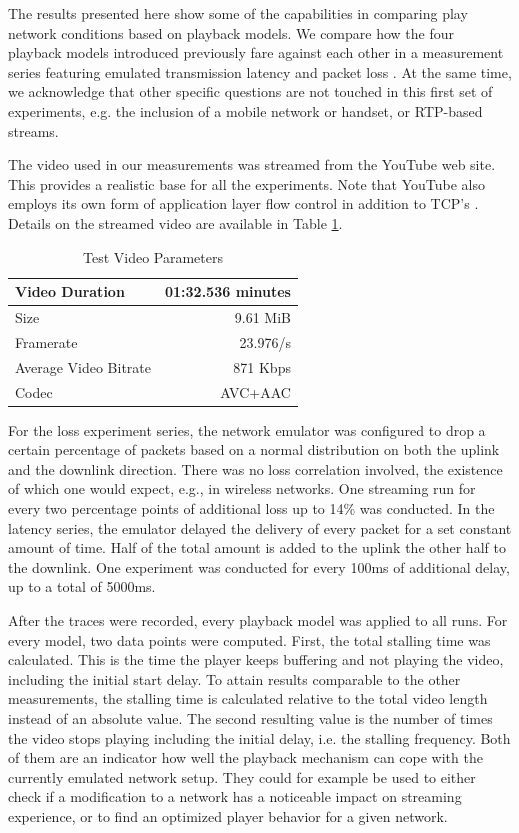 The results presented here show some of the capabilities in comparing play network conditions based on playback models. We compare how the four playback models introduced previously fare against each other in a measurement series featuring  emulated transmission latency and packet loss . At the same time, we acknowledge that other specific questions are not touched in this first set of experiments, e.g. the inclusion of a mobile network or handset, or RTP-based streams.

The video used in our measurements was streamed from the YouTube web site. This provides a realistic base for all the experiments. Note that YouTube also employs its own form of application layer flow control in addition to TCP's \cite{alcock2011application}. %
Details on the streamed video are available in Table \ref{tbl:videoparams}.

\begin{table}
\centering
\caption{Test Video Parameters}
\label{tbl:videoparams}
\begin{tabular}{l|r}
Video Duration	& 01:32.536 minutes \\ \hline
Size & 9.61 MiB \\ \hline
Framerate & 23.976/s \\ \hline
Average Video Bitrate & 871 Kbps \\ \hline
Codec & AVC+AAC \\ \hline
\end{tabular}
\end{table}

For the loss experiment series, the network emulator was configured to drop a certain percentage of packets based on a normal distribution on both the uplink and the downlink direction. There was no loss correlation involved, the existence of which one would expect, e.g., in wireless networks. One streaming run for every two percentage points of additional loss up to 14\% was conducted.
In the latency series, the emulator delayed the delivery of every packet for a set constant amount of time. Half of the total amount is added to the uplink the other half to the downlink. One experiment was conducted for every 100ms of additional delay, up to a total of 5000ms.

After the traces were recorded, every playback model was applied to all runs. For every model, two data points were computed. First, the total stalling time was calculated. This is the time the player keeps buffering and not playing the video, including the initial start delay. To attain results comparable to the other measurements, the stalling time is calculated relative to the total video length instead of an absolute value. The second resulting value is the number of times the video stops playing including the initial delay, i.e. the stalling frequency. Both of them are an indicator how well the playback mechanism can cope with the currently emulated network setup. They could for example be used to either check if a modification to a network has a noticeable impact on streaming experience, or to find an optimized player behavior for a given network.

